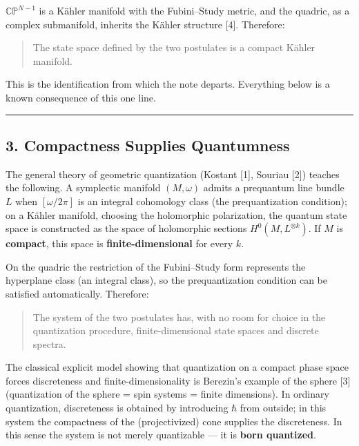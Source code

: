 \documentclass[
  a4paper,
]{article}
\begin{document}
\(\mathbb{CP}^{N-1}\) is a Kähler manifold with the Fubini--Study
metric, and the quadric, as a complex submanifold, inherits the Kähler
structure {[}4{]}. Therefore:

\begin{quote}
The state space defined by the two postulates is a compact Kähler
manifold.
\end{quote}

This is the identification from which the note departs. Everything below
is a known consequence of this one line.

\begin{center}\rule{0.5\linewidth}{0.5pt}\end{center}

\subsection{3. Compactness Supplies
Quantumness}\label{compactness-supplies-quantumness}

The general theory of geometric quantization (Kostant {[}1{]}, Souriau
{[}2{]}) teaches the following. A symplectic manifold \((M,\omega)\)
admits a prequantum line bundle \(L\) when \([\omega/2\pi]\) is an
integral cohomology class (the prequantization condition); on a Kähler
manifold, choosing the holomorphic polarization, the quantum state space
is constructed as the space of holomorphic sections
\(H^0(M,L^{\otimes k})\). If \(M\) is \textbf{compact}, this space is
\textbf{finite-dimensional} for every \(k\).

On the quadric the restriction of the Fubini--Study form represents the
hyperplane class (an integral class), so the prequantization condition
can be satisfied automatically. Therefore:

\begin{quote}
The system of the two postulates has, with no room for choice in the
quantization procedure, finite-dimensional state spaces and discrete
spectra.
\end{quote}

The classical explicit model showing that quantization on a compact
phase space forces discreteness and finite-dimensionality is Berezin's
example of the sphere {[}3{]} (quantization of the sphere = spin systems
= finite dimensions). In ordinary quantization, discreteness is obtained
by introducing \(\hbar\) from outside; in this system the compactness of
the (projectivized) cone supplies the discreteness. In this sense the
system is not merely quantizable --- it is \textbf{born quantized}.
\end{document}
